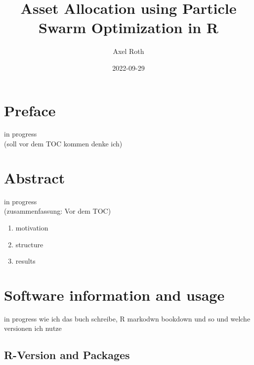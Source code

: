 \documentclass[
  oneside]{book}
\title{Asset Allocation using Particle Swarm Optimization in R}
\author{Axel Roth}
\date{2022-09-29}
\begin{document}
\maketitle

{
\setcounter{tocdepth}{1}
\tableofcontents
}
\hypertarget{preface}{%
\chapter*{Preface}\label{preface}}

\renewcommand{\chaptermark}[1]{\markboth{\uppercase{#1}}{\uppercase{#1}}}

\textbar\textbar\textbar in progress\textbar\textbar\textbar{}\\
(soll vor dem TOC kommen denke ich)

\renewcommand{\chaptermark}[1]{\markboth{\uppercase{\thechapter. \ #1}}{}}

\hypertarget{abstract}{%
\chapter*{Abstract}\label{abstract}}

\textbar\textbar\textbar in progress\textbar\textbar\textbar{}\\
(zusammenfassung: Vor dem TOC)

\begin{enumerate}
\def\labelenumi{\arabic{enumi}.}
\item
  motivation
\item
  structure
\item
  results
\end{enumerate}

\hypertarget{software-information-and-usage}{%
\chapter{Software information and usage}\label{software-information-and-usage}}

\textbar\textbar\textbar in progress\textbar\textbar\textbar{}
wie ich das buch schreibe, R markodwn bookdown und so und welche versionen ich nutze

\hypertarget{r-version-and-packages}{%
\section{R-Version and Packages}\label{r-version-and-packages}}
\end{document}
